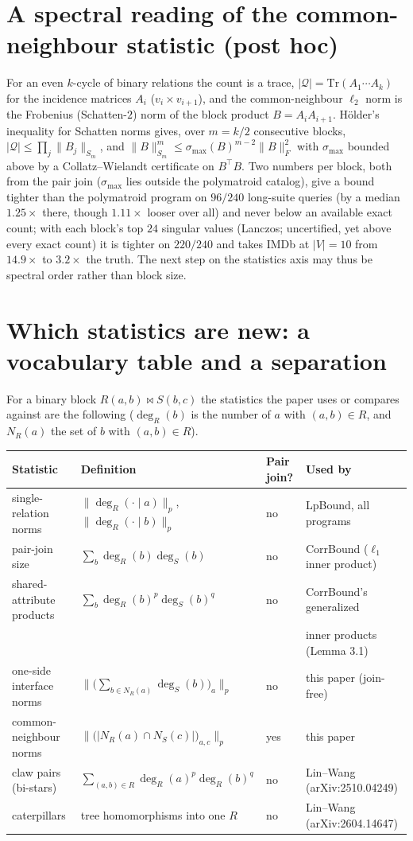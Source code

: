\documentclass[11pt]{article}
\newcommand{\query}{\mathcal{Q}}
\begin{document}
\section{A spectral reading of the common-neighbour statistic (post hoc)}
For an even $k$-cycle of binary relations the
count is a trace, $|\query|=\mathrm{Tr}(A_1\cdots A_k)$ for the incidence
matrices $A_i$ ($v_i\times v_{i+1}$), and the common-neighbour $\ell_2$
norm is the Frobenius (Schatten-$2$) norm of the block product
$B=A_iA_{i+1}$. Hölder's inequality for Schatten norms gives, over $m=k/2$
consecutive blocks, $|\query|\le\prod_j\|B_j\|_{S_m}$, and
$\|B\|_{S_m}^m\le\sigma_{\max}(B)^{m-2}\|B\|_F^2$ with $\sigma_{\max}$
bounded above by a Collatz--Wielandt certificate on $B^{\top}B$. Two
numbers per block, both from the pair join ($\sigma_{\max}$ lies outside the
polymatroid catalog), give a bound tighter than the polymatroid program on
$96/240$ long-suite queries (by a median $1.25\times$ there, though $1.11\times$
looser over all) and never below an available exact count; with each block's top
$24$ singular values (Lanczos; uncertified, yet above every exact count)
it is tighter on $220/240$ and takes IMDb at $|V|{=}10$ from
$14.9\times$ to $3.2\times$ the truth. The next step on the statistics axis may thus be spectral order rather
than block size.

\section{Which statistics are new: a vocabulary table and a separation}

For a binary block $R(a,b)\bowtie S(b,c)$ the statistics the paper uses or
compares against are the following ($\deg_R(b)$ is the number of $a$ with
$(a,b)\in R$, and $N_R(a)$ the set of $b$ with $(a,b)\in R$).

\begin{center}
\small
\begin{tabular}{@{}llll@{}}
\toprule
Statistic & Definition & Pair join? & Used by \\
\midrule
single-relation norms & $\|\deg_R(\cdot\mid a)\|_p$, $\|\deg_R(\cdot\mid b)\|_p$ & no & LpBound, all programs \\
pair-join size & $\sum_b\deg_R(b)\deg_S(b)$ & no & CorrBound ($\ell_1$ inner product) \\
shared-attribute products & $\sum_b\deg_R(b)^{p}\deg_S(b)^{q}$ & no & CorrBound's generalized \\
 & & & inner products (Lemma 3.1) \\
one-side interface norms & $\big\|\big(\sum_{b\in N_R(a)}\deg_S(b)\big)_a\big\|_p$ & no & this paper (join-free) \\
common-neighbour norms & $\big\|\big(|N_R(a)\cap N_S(c)|\big)_{a,c}\big\|_p$ & yes & this paper \\
claw pairs (bi-stars) & $\sum_{(a,b)\in R}\deg_R(a)^{p}\deg_R(b)^{q}$ & no & Lin--Wang (arXiv:2510.04249) \\
caterpillars & tree homomorphisms into one $R$ & no & Lin--Wang (arXiv:2604.14647) \\
\bottomrule
\end{tabular}
\end{center}
\end{document}
